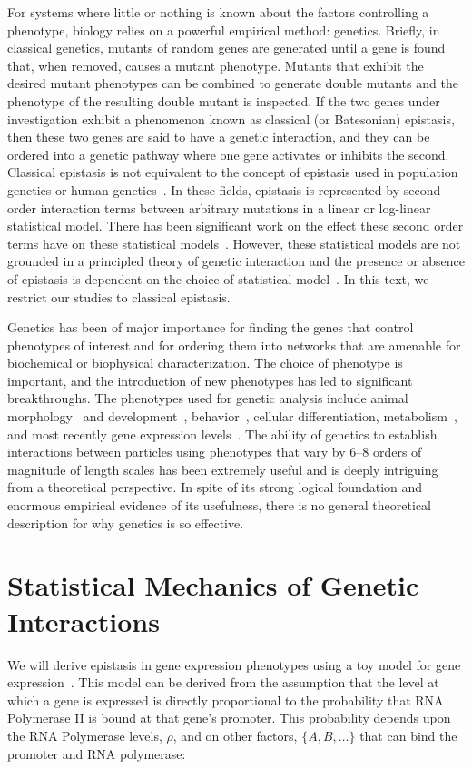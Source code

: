 For systems where little or nothing is known about the factors controlling a
phenotype, biology relies on a powerful empirical method: genetics.
Briefly, in classical genetics, mutants of random genes are generated until a
gene is found that, when removed, causes a mutant phenotype. Mutants that
exhibit the desired mutant phenotypes can be combined to generate double mutants
and the phenotype of the resulting double mutant is inspected. If the two genes
under investigation exhibit a phenomenon known as classical (or Batesonian)
epistasis, then these two genes are said to have a genetic interaction, and they
can be ordered into a genetic pathway where one gene activates or inhibits the
second. Classical epistasis is not equivalent to the concept of epistasis used
in population genetics or human genetics~\citep{Cordell2002}. In these fields,
epistasis is represented by second order interaction terms between arbitrary
mutations in a linear or log-linear statistical model. There has been
significant work on the effect these second order terms have on these
statistical models~\citep{Crow2010,Mackay2014}. However, these statistical
models are not grounded in a principled theory of genetic interaction and the
presence or absence of epistasis is dependent on the choice of statistical
model~\citep{Cordell2002}. In this text, we restrict our studies to classical
epistasis.

Genetics has been of major importance for finding the genes that control
phenotypes of interest and for ordering them into networks that are amenable for
biochemical or biophysical characterization. The choice of phenotype is
important, and the introduction of new phenotypes has led to significant
breakthroughs. The phenotypes used for genetic analysis include animal
morphology~\citep{Brenner1974} and development~\citep{Jurgens1984},
behavior~\citep{Benzer1967}, cellular differentiation,
metabolism~\citep{Beadle499}, and most recently gene expression
levels~\citep{Angeles-Albores2018a,Hughes2000,Capaldi2008}. The ability of
genetics to establish interactions between particles using phenotypes that vary
by 6--8 orders of magnitude of length scales has been extremely useful and is
deeply intriguing from a theoretical perspective. In spite of its strong logical
foundation and enormous empirical evidence of its usefulness, there is no
general theoretical description for why genetics is so effective.

\section*{Statistical Mechanics of Genetic Interactions}
We will derive epistasis in gene expression phenotypes using a toy model for
gene expression~\citep{Garcia2007,Bintu2005a}. This model can be derived from
the assumption that the level at which a gene is expressed is directly
proportional to the probability that RNA Polymerase II is bound at that gene's
promoter. This probability depends upon the RNA Polymerase levels, \( \rho \),
and on other factors, \( \{A, B, \ldots \} \) that can bind the promoter and RNA
polymerase:

